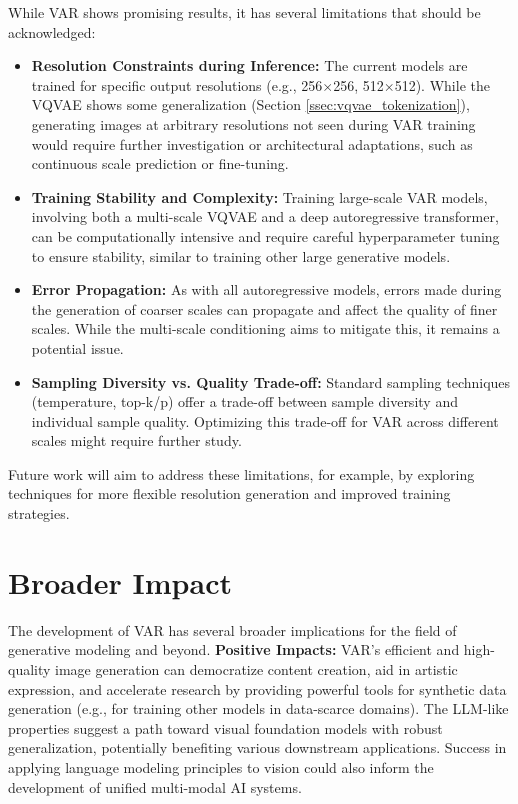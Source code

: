 \documentclass{article}
\begin{document}
While VAR shows promising results, it has several limitations that should be acknowledged:
\begin{itemize}[leftmargin=*,itemsep=1pt,topsep=2pt]
    \item \textbf{Resolution Constraints during Inference:} The current models are trained for specific output resolutions (e.g., 256$\times$256, 512$\times$512). While the VQVAE shows some generalization (Section \ref{ssec:vqvae_tokenization}), generating images at arbitrary resolutions not seen during VAR training would require further investigation or architectural adaptations, such as continuous scale prediction or fine-tuning.
    \item \textbf{Training Stability and Complexity:} Training large-scale VAR models, involving both a multi-scale VQVAE and a deep autoregressive transformer, can be computationally intensive and require careful hyperparameter tuning to ensure stability, similar to training other large generative models.
    \item \textbf{Error Propagation:} As with all autoregressive models, errors made during the generation of coarser scales can propagate and affect the quality of finer scales. While the multi-scale conditioning aims to mitigate this, it remains a potential issue.
    \item \textbf{Sampling Diversity vs. Quality Trade-off:} Standard sampling techniques (temperature, top-k/p) offer a trade-off between sample diversity and individual sample quality. Optimizing this trade-off for VAR across different scales might require further study.
\end{itemize}
Future work will aim to address these limitations, for example, by exploring techniques for more flexible resolution generation and improved training strategies.

\section{Broader Impact}
\label{sec:broader_impact}

The development of VAR has several broader implications for the field of generative modeling and beyond.
\textbf{Positive Impacts:} VAR's efficient and high-quality image generation can democratize content creation, aid in artistic expression, and accelerate research by providing powerful tools for synthetic data generation (e.g., for training other models in data-scarce domains). The LLM-like properties suggest a path toward visual foundation models with robust generalization, potentially benefiting various downstream applications. Success in applying language modeling principles to vision could also inform the development of unified multi-modal AI systems.
\end{document}
